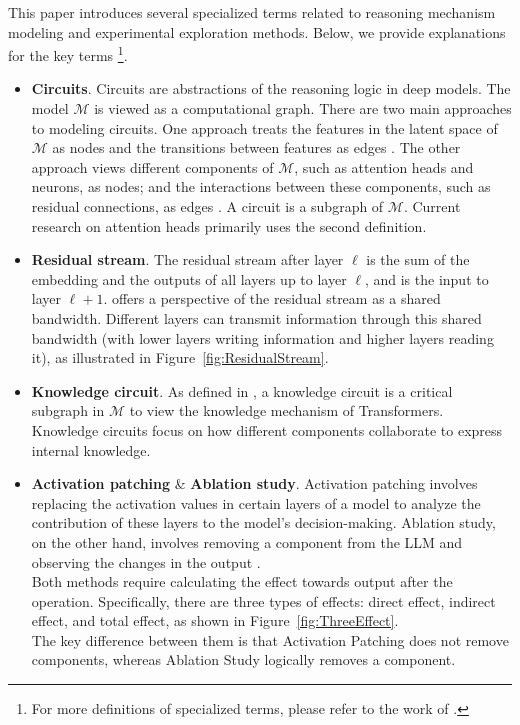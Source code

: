 This paper introduces several specialized terms related to reasoning mechanism modeling and experimental exploration methods. Below, we provide explanations for the key terms \footnote{For more definitions of specialized terms, please refer to the work of \citet{InterpTermExplain_Blog}.}.

\begin{itemize}
    \item \textbf{Circuits}. Circuits are abstractions of the reasoning logic in deep models. The model $\mathcal{M}$ is viewed as a computational graph. There are two main approaches to modeling circuits. One approach treats the features in the latent space of $\mathcal{M}$ as nodes and the transitions between features as edges \citep{OldCircuit_20_distill_OpenAI}. The other approach views different components of $\mathcal{M}$, such as attention heads and neurons, as nodes; and the interactions between these components, such as residual connections, as edges \citep{IOI_23_ICLR_Redwood}. A circuit is a subgraph of $\mathcal{M}$. Current research on attention heads primarily uses the second definition.
    
    \item \textbf{Residual stream}. The residual stream after layer $\ell$ is the sum of the embedding and the outputs of all layers up to layer $\ell$, and is the input to layer $\ell+1$. \citet{MathFrame_21_TCT_Anthropic} offers a perspective of the residual stream as a shared bandwidth. Different layers can transmit information through this shared bandwidth (with lower layers writing information and higher layers reading it), as illustrated in Figure~\ref{fig:ResidualStream}.
    
    \item \textbf{Knowledge circuit}. As defined in \citep{KnowledgeCircuit_24_arXiv_ZJU}, a knowledge circuit is a critical subgraph in $\mathcal{M}$ to view the knowledge mechanism of Transformers. Knowledge circuits focus on how different components collaborate to express internal knowledge.
    
    \item \textbf{Activation patching} \& \textbf{Ablation study}. Activation patching involves replacing the activation values in certain layers of a model to analyze the contribution of these layers to the model's decision-making. Ablation study, on the other hand, involves removing a component from the LLM and observing the changes in the output \citep{ActivationPatching_24_arXiv_Google}.\\
    Both methods require calculating the effect towards output after the operation. Specifically, there are three types of effects: direct effect, indirect effect, and total effect, as shown in Figure~\ref{fig:ThreeEffect}.\\
    The key difference between them is that Activation Patching does not remove components, whereas Ablation Study logically removes a component.
    

\end{itemize}
